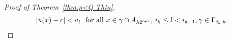 \documentclass[10pt]{amsart}
\numberwithin{equation}{section}
\begin{document}
\begin{proof}[Proof of Theorem~\ref{thm:p<Q Thin}]
    \begin{equation}\label{eq3.4-1401}
        |u(x)-c|<a_l \text{\rm \ \ for all $x\in \gamma\cap A_{\lambda 2^{l+1}}$, $i_k\leq l< i_{k+1}, \gamma\in \Gamma_{j_k,k}$}.
    \end{equation}    


\end{proof}
\end{document}
